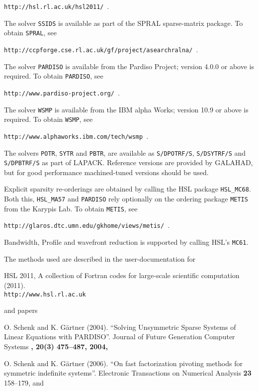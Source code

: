 \documentclass{galahad}
\begin{document}
{\tt http://hsl.rl.ac.uk/hsl2011/ }.

\noindent
The solver {\tt SSIDS} is available as part of the SPRAL sparse-matrix package.
To obtain {\tt SPRAL}, see

{\tt http://ccpforge.cse.rl.ac.uk/gf/project/asearchralna/ }.

\noindent
The solver {\tt PARDISO} is available from the Pardiso Project;
version 4.0.0 or above is required.
To obtain {\tt PARDISO}, see

{\tt http://www.pardiso-project.org/ }.

\noindent
The solver {\tt WSMP} is available from the IBM alpha Works;
version 10.9 or above is required.
To obtain {\tt WSMP}, see

{\tt http://www.alphaworks.ibm.com/tech/wsmp }.

\noindent
The solvers {\tt POTR}, {\tt SYTR} and {\tt PBTR},
are available as
{\tt S/DPOTRF/S},
{\tt S/DSYTRF/S} and {\tt S/DPBTRF/S}
as part of LAPACK. Reference versions
are provided by GALAHAD, but for good performance
machined-tuned versions should be used.

\noindent
Explicit sparsity re-orderings are obtained by calling the HSL package
{\tt HSL\_MC68}.
Both this, {\tt HSL\_MA57} and {\tt PARDISO} rely optionally
on the ordering package {\tt METIS} from the Karypis Lab. To obtain
{\tt METIS}, see

{\tt http://glaros.dtc.umn.edu/gkhome/views/metis/ }.

\noindent
Bandwidth, Profile and wavefront reduction is supported by
calling HSL's {\tt MC61}.

\vspace*{1mm}

\galreferences
\vspace*{1mm}

\noindent
The methods used are described in the user-documentation for
\vspace*{1mm}

\noindent
HSL 2011, A collection of {F}ortran codes for large-scale scientific
 computation (2011). \\
 {\tt http://www.hsl.rl.ac.uk}

\noindent
and papers

\noindent
O. Schenk and K. G\"{a}rtner (2004).
``Solving Unsymmetric Sparse Systems of Linear Equations with PARDISO''.
Journal of Future Generation Computer Systems \bf, 20(3) \rm 475--487, 2004,

\noindent
O. Schenk and K. G\"{a}rtner (2006).
``On fast factorization pivoting methods for symmetric indefinite systems''.
Electronic Transactions on Numerical Analysis
{\bf 23} 158--179,
and
\end{document}

